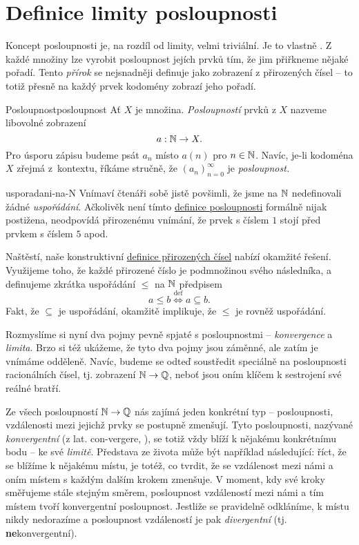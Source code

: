 \section{Definice limity posloupnosti}
\label{sec:definice-limity-posloupnosti}

Koncept posloupnosti je, na rozdíl od limity, velmi triviální. Je to vlastně
. Z každé množiny lze vyrobit posloupnost jejích
prvků tím, že jim přiřkneme nějaké pořadí. Tento \emph{přírok} se nejsnadněji
definuje jako zobrazení z přirozených čísel -- to totiž přesně na každý prvek
kodomény zobrazí jeho pořadí.

\begin{definition}{Posloupnost}{posloupnost}
 Ať $X$ je množina. \emph{Posloupností} prvků z $X$ nazveme libovolné zobrazení
 \[
  a:\mathbb{N} \to X.
 \]
 Pro úsporu zápisu budeme psát $a_n$ místo $a(n)$ pro $n \in \mathbb{N}$. Navíc, je-li
 kodoména $X$ zřejmá z~kontextu, říkáme stručně, že $(a_n)_{n=0}^{\infty}$ je
 \emph{posloupnost.}
\end{definition}

\begin{remark}{}{usporadani-na-N}
 Vnímaví čtenáři sobě jistě povšimli, že jsme na $\mathbb{N}$ nedefinovali žádné
 \emph{uspořádání}. Ačkolivěk není tímto \hyperref[def:posloupnost]{definice
 posloupnosti} formálně nijak postižena, neodpovídá přirozenému vnímání, že
 prvek s číslem $1$ stojí před prvkem s číslem $5$ apod.

 Naštěstí, naše konstruktivní \hyperref[def:prirozena-cisla]{definice
 přirozených čísel} nabízí okamžité řešení. Využijeme toho, že každé přirozené
 číslo je podmnožinou svého následníka, a definujeme zkrátka uspořádání $ \leq $
 na $\mathbb{N}$ předpisem
 \[
  a \leq b \overset{\text{def}}{\iff} a \subseteq b.
 \]
 Fakt, že $ \subseteq $ je uspořádání, okamžitě implikuje, že $ \leq $ je rovněž
 uspořádání.
\end{remark}

Rozmyslíme si nyní dva pojmy pevně spjaté s posloupnostmi -- \emph{konvergence}
a \emph{limita}. Brzo si též ukážeme, že tyto dva pojmy jsou záměnné, ale zatím
je vnímáme odděleně. Navíc, budeme se odteď soustředit speciálně na posloupnosti
racionálních čísel, tj. zobrazení $\mathbb{N} \to \mathbb{Q}$, neboť jsou oním klíčem k
sestrojení své reálné bratří.

Ze všech posloupností $\mathbb{N} \to \mathbb{Q}$ nás zajímá jeden konkrétní typ --
posloupnosti, vzdálenosti mezi jejichž prvky se postupně zmenšují. Tyto
posloupnosti, nazývané \emph{konvergentní} (z lat. con-vergere, ), se totiž vždy blíží k nějakému konkrétnímu bodu -- ke své \emph{limitě}.
Představa ze života může být například následující: říct, že se blížíme k
nějakému místu, je totéž, co tvrdit, že se vzdálenost mezi námi a oním místem s
každým dalším krokem zmenšuje. V moment, kdy své kroky směřujeme stále stejným
směrem, posloupnost vzdáleností mezi námi a tím místem tvoří konvergentní
posloupnost. Jestliže se pravidelně odkláníme, k místu nikdy nedorazíme a
posloupnost vzdáleností je pak \emph{divergentní} (tj.
\textbf{ne}konvergentní).

